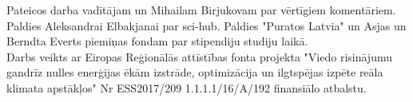 Pateicos darba vadītājam un Mihailam Birjukovam par vērtīgiem komentāriem. Paldies Aleksandrai Elbakjanai par sci-hub. Paldies "Puratos Latvia" un Asjas un Berndta Everts piemiņas fondam par stipendiju studiju laikā.\\

Darbs veikts ar Eiropas Reģionālās attīstības fonta projekta "Viedo risinājumu gandrīz nulles enerģijas ēkām izstrāde, optimizācija un ilgtspējas izpēte reāla klimata apstākļos" Nr ESS2017/209 1.1.1.1/16/A/192 finansiālo atbalstu.
